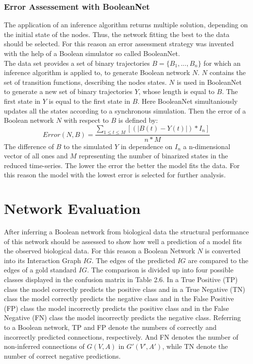\subsubsection*{Error Assessement with BooleanNet}
The application of an inference algorithm returns multiple solution, depending on the initial state of the nodes. Thus, the network fitting the best to the data should be selected. For this reason an error assessment strategy was invented with the help of a Boolean simulator so called BooleanNet.\\%
The data set provides a set of binary trajectories $B=\{B_{1},...,B_{n}\}$ for which an inference algorithm is applied to, to generate Boolean network $N$. $N$ contains the set of transition functions, describing the nodes states. $N$ is used in BooleanNet to generate a new set of binary trajectories $Y$, whose length is equal to $B$. The first state in $Y$ is equal to the first state in $B$. Here BooleanNet simultaniously updates all the states according to a synchronous simulation. Then the error of a Boolean network $N$ with respect to $B$ is defined by:
\begin{equation}
Error(N,B)=\frac{\sum_{1\le t\le M} [(|B(t)-Y(t)|)*I_{n}]}{n*M}
\end{equation}
The difference of $B$ to the simulated $Y$ in dependence on $I_{n}$ a n-dimensional vector of all ones and $M$ representing the number of binarized states in the reduced time-series. The lower the error the better the model fits the data. For this reason the model with the lowest error is selected for further analysis.


\section{Network Evaluation}
After inferring a Boolean network from biological data the structural performance of this network should be assessed to show how well a prediction of a model fits the observed biological data. For this reason a Boolean Network $N$ is converted into its Interaction Graph $IG$. The edges of the predicted $IG$ are compared to the edges of a gold standard $IG$. The comparison is divided up into four possible classes displayed in the confusion matrix in Table 2.6. In a True Positive (TP) class the model correctly predicts the positive class and in a True Negative (TN) class the model correctly predicts the negative class and in the False Positive (FP) class the model incorrectly predicts the positive class and in the False Negative (FN) class the model incorrectly predicts the negative class. Referring to a Boolean network, TP and FP denote the numbers of correctly and incorrectly predicted connections, respectively. And FN denotes the number of non-inferred connections of $G(V,A)$ in $G'(V',A')$, while TN denote the number of correct negative predictions. 

